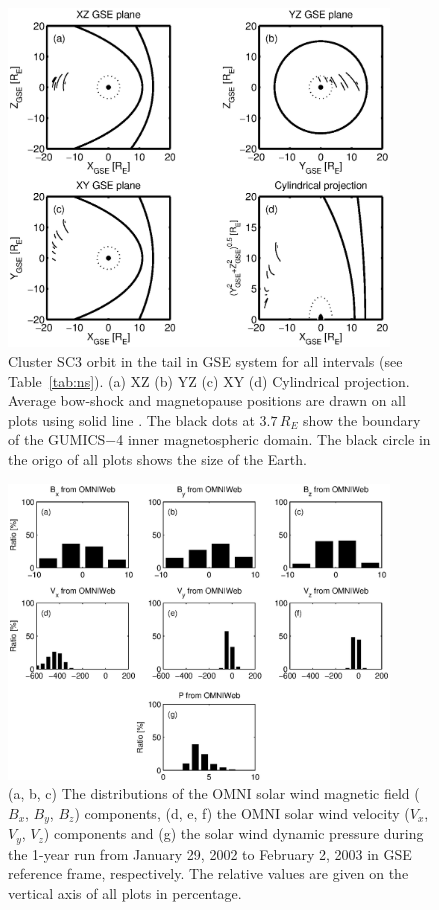 \documentclass[linenumbers,draft]{agujournal}
\begin{document}
\begin{figure}[h]
\centering
\includegraphics[width=0.9\textwidth,angle=0]{swe-2020-corr-f12.eps}  
\caption{Cluster SC3 orbit in the tail in GSE system for all intervals (see Table~\ref{tab:ns}). (a) XZ (b) YZ (c) XY (d) Cylindrical projection. Average bow-shock and magnetopause positions are drawn on all plots using solid line \citep[][respectively]{peredo95:_three_alfven_mach,tsyganenko95:_model_earth}. The black dots at $3.7\,R_E$ show the boundary of the GUMICS$-$4 inner magnetospheric domain. The black circle in the origo of all plots shows the size of the Earth.}
\label{fig:nsorbit}
\end{figure}

\pagebreak

\begin{figure}[h]
\centering
\includegraphics[width=0.9\textwidth,angle=0]{swe-2020-corr-f13.eps}  
\caption{(a, b, c) The distributions of the OMNI solar wind magnetic field ($B_{x}$, $B_{y}$, $B_{z}$) components, (d, e, f) the OMNI solar wind velocity ($V_{x}$, $V_{y}$, $V_{z}$) components and (g) the solar wind dynamic pressure during the 1-year run from January 29, 2002 to February 2, 2003 in GSE reference frame, respectively. The relative values are given on the vertical axis of all plots in percentage.}
\label{fig:omnidist}
\end{figure}
\end{document}
